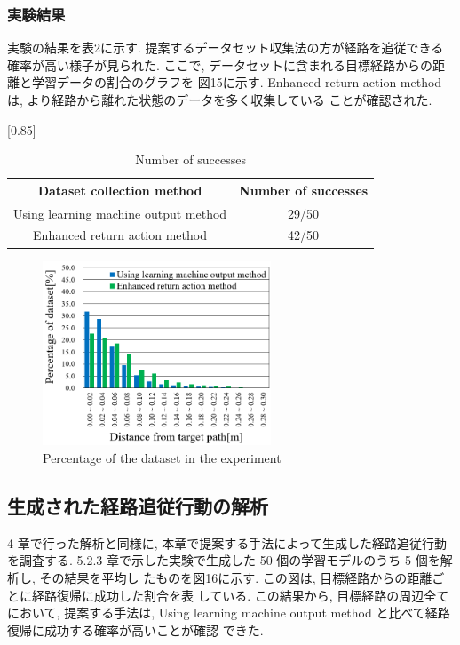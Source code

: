 \documentclass{jarticle}
\begin{document}
\subsubsection{実験結果}
実験の結果を表2に示す. 提案するデータセット収集法の方が経路を追従できる確率が高い様子が見られた.
ここで, データセットに含まれる目標経路からの距離と学習データの割合のグラフを
図15に示す. Enhanced return action method は, より経路から離れた状態のデータを多く収集している
ことが確認された.


\begin{table}[h!]
  \centering
  \caption{Number of successes} \vspace*{2mm}
    \scalebox{0.85}[0.85] {
    \begin{tabular}{|c|c|}
      \hline\hline
      Dataset collection method & Number of successes \\
      \hline\hline
      Using learning machine output method & 29/50 \\
      Enhanced return action method & 42/50\\
      \hline 
    \end{tabular} }
\end {table}


\begin{figure}[h!]\vspace*{-5mm}
  \centering
   \includegraphics[height=55mm]{./figs/tes2.png}
   \caption{Percentage of the dataset in the experiment}
\end{figure}

\subsection{生成された経路追従行動の解析}
4 章で行った解析と同様に, 本章で提案する手法によって生成した経路追従行動を調査する.
5.2.3 章で示した実験で生成した 50 個の学習モデルのうち 5 個を解析し, その結果を平均し
たものを図16に示す. この図は, 目標経路からの距離ごとに経路復帰に成功した割合を表
している. この結果から, 目標経路の周辺全てにおいて, 提案する手法は,
Using learning machine output method と比べて経路復帰に成功する確率が高いことが確認
できた.
\end{document}
